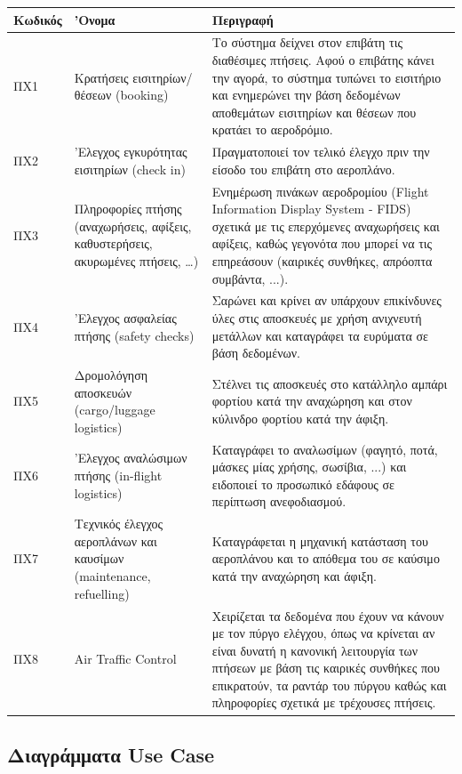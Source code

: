 \documentclass[12pt]{article}
\begin{document}
\begin{center}
\begin{tabular}{|l|p{7cm}|p{7cm}|}
	\hline
	\textbf{Κωδικός} & \textbf{'Ονομα} & \textbf{Περιγραφή} \\
	\hline
	ΠΧ1 & Κρατήσεις εισιτηρίων/θέσεων (booking) &
	Το σύστημα δείχνει στον επιβάτη τις διαθέσιμες πτήσεις. Αφού ο επιβάτης
	κάνει την αγορά, το σύστημα τυπώνει το εισιτήριο και ενημερώνει την
	βάση δεδομένων αποθεμάτων εισιτηρίων και θέσεων που κρατάει το
	αεροδρόμιο. \\
	\hline
	ΠΧ2 & 'Ελεγχος εγκυρότητας εισιτηρίων (check in) &
	Πραγματοποιεί τον τελικό έλεγχο πριν την είσοδο του επιβάτη στο
	αεροπλάνο. \\
	\hline
	ΠΧ3 & Πληροφορίες πτήσης (αναχωρήσεις, αφίξεις, καθυστερήσεις,
	ακυρωμένες πτήσεις, …) & Ενημέρωση πινάκων αεροδρομίου (Flight
	Information Display System - FIDS) σχετικά με τις επερχόμενες
	αναχωρήσεις και αφίξεις, καθώς γεγονότα που μπορεί να τις επηρεάσουν
	(καιρικές συνθήκες, απρόοπτα συμβάντα, ...). \\
	\hline
	ΠΧ4 & 'Ελεγχος ασφαλείας πτήσης (safety checks) &
	Σαρώνει και κρίνει αν υπάρχουν επικίνδυνες ύλες στις αποσκευές με
	χρήση ανιχνευτή μετάλλων και καταγράφει τα ευρύματα σε βάση
	δεδομένων. \\
	\hline
	ΠΧ5 & Δρομολόγηση αποσκευών (cargo/luggage logistics) &
	Στέλνει τις αποσκευές στο κατάλληλο αμπάρι φορτίου κατά την αναχώρηση
	και στον κύλινδρο φορτίου κατά την άφιξη. \\
	\hline
	ΠΧ6 & 'Ελεγχος αναλώσιμων πτήσης (in-flight logistics) &
	Καταγράφει το αναλωσίμων (φαγητό, ποτά, μάσκες μίας χρήσης, σωσίβια,
	...) και ειδοποιεί το προσωπικό εδάφους σε περίπτωση ανεφοδιασμού. \\
	\hline
	ΠΧ7 & Τεχνικός έλεγχος αεροπλάνων και καυσίμων (maintenance, refuelling) &
	Καταγράφεται η μηχανική κατάσταση του αεροπλάνου και το απόθεμα του σε
	καύσιμο κατά την αναχώρηση και άφιξη. \\
	\hline
	ΠΧ8 & Air Traffic Control &
	Χειρίζεται τα δεδομένα που έχουν να κάνουν με τον πύργο ελέγχου, όπως
	να κρίνεται αν είναι δυνατή η κανονική λειτουργία των πτήσεων με βάση
	τις καιρικές συνθήκες που επικρατούν, τα ραντάρ του πύργου καθώς και
	πληροφορίες σχετικά με τρέχουσες πτήσεις. \\
	\hline
\end{tabular}
\end{center}

\subsection{Διαγράμματα Use Case}
\end{document}
